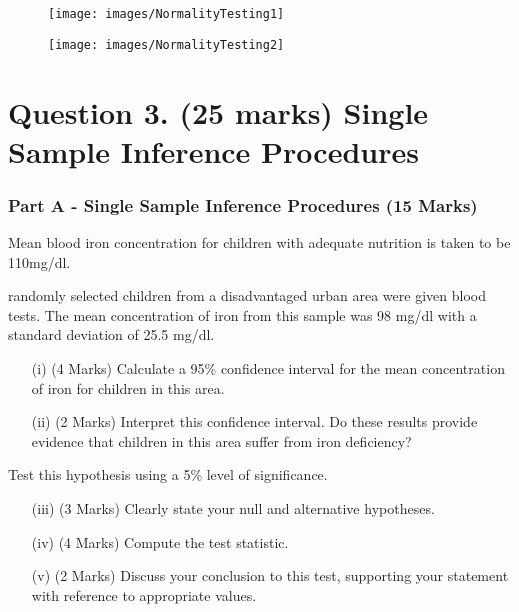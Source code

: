 \documentclass[a4paper,12pt]{article}
\begin{document}
\begin{figure}[h!]
	\centering
	\texttt{[image: images/NormalityTesting1]}
\end{figure}
\begin{figure}[h!]
	\centering
	\texttt{[image: images/NormalityTesting2]}
\end{figure}

\newpage






\section*{Question 3. (25 marks) Single Sample Inference Procedures }
\subsubsection*{Part A - Single Sample Inference Procedures (15 Marks)}
Mean blood iron concentration for children with adequate nutrition is taken to be 110mg/dl. \\ \smallskip


 randomly selected children from a disadvantaged urban area were given blood tests. The mean concentration of iron from this sample was 98 mg/dl with a standard deviation of 25.5 mg/dl.
\begin{itemize}
	\item[(i)] (4 Marks) Calculate a 95\% confidence interval for the mean concentration of iron for children in this area. 
	\item[(ii)](2 Marks) Interpret this confidence interval.  Do these results provide evidence that children in this area suffer from iron deficiency? 
\end{itemize}
\medskip
Test this hypothesis using a 5\% level of significance. 

\begin{itemize}
	\item[(iii)](3 Marks) Clearly state your null and alternative hypotheses.
	\item[(iv)](4 Marks) Compute the test statistic.
	\item[(v)](2 Marks) Discuss your conclusion to this test, supporting your statement with reference to appropriate values.
\end{itemize}


\newpage
\end{document}
